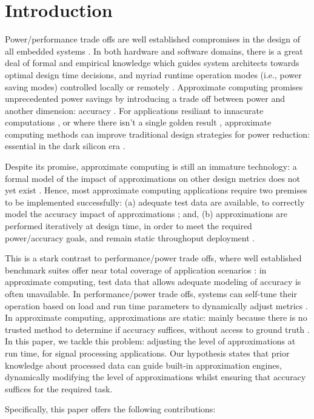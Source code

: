\section{Introduction}

Power/performance trade offs are well established compromises in the design of all embedded systems \cite{das2016reliability}. In both hardware and software domains, there is a great deal of formal and empirical knowledge which guides system architects towards optimal design time decisions, and myriad runtime operation modes (i.e., power saving modes) controlled locally or remotely \cite{senni2016non}. Approximate computing promises unprecedented power savings by introducing a trade off between power and another dimension: accuracy \cite{mittal2016survey}. For applications resiliant to innacurate computations \cite{xu2016approximate}, or where there isn't a single golden result \cite{venkataramani2016approximate}, approximate computing methods can improve traditional design strategies for power reduction: essential in the dark silicon era \cite{mitra2017power}.
\par Despite its promise, approximate computing is still an immature technology: a formal model of the impact of approximations on other design metrics does not yet exist \cite{venkataramani2015approximate}. Hence, most approximate computing applications require two premises to be implemented successfully: (a) adequate test data are available, to correctly model the accuracy impact of approximations \cite{yazdanbakhsh2017axbench}; and, (b) approximations are performed iteratively at design time, in order to meet the required power/accuracy goals, and remain static throughoput deployment \cite{nepal2016automated}.
\par This is a stark contrast to performance/power trade offs, where well established benchmark suites offer near total coverage of application scenarios \cite{henning2000spec}: in approximate computing, test data that allows adequate modeling of accuracy is often unavailable. In performance/power trade offs, systems can self-tune their operation based on load and run time parameters to dynamically adjust metrics \cite{isci2003runtime}. In approximate computing, approximations are static: mainly because there is no trusted method to determine if accuracy suffices, without access to ground truth \cite{chippa2013analysis}. In this paper, we tackle this problem:  adjusting the level of approximations at run time, for signal processing applications. Our hypothesis states that prior knowledge about processed data can guide built-in approximation engines, dynamically modifying the level of approximations whilst ensuring that accuracy suffices for the required task.
\par Specifically, this paper offers the following contributions:

